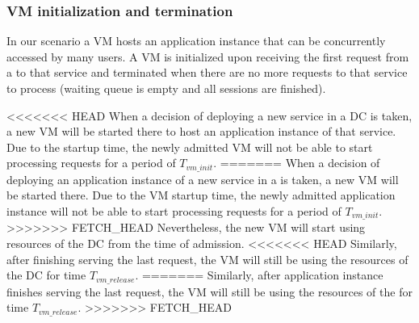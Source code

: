 \subsubsection{VM initialization and termination}
In our scenario a VM hosts an application instance that can be concurrently accessed by many users.
A VM is initialized upon receiving the first request from a \ue{} to that service and terminated when there are no more requests to that service to process (waiting queue is empty and all sessions are finished).

<<<<<<< HEAD
When a decision of deploying a new service in a \ac{DC} is taken, a new VM will be started there to host an application instance of that service.
Due to the startup time, the newly admitted VM will not be able to start processing requests for a period of $T_{vm\_init}$. 
=======
When a decision of deploying an application instance of a new service in a \dc{} is taken, a new VM will be started there.
Due to the VM startup time, the newly admitted application instance will not be able to start processing requests for a period of $T_{vm\_init}$. 
>>>>>>> FETCH_HEAD
Nevertheless, the new VM will start using resources of the \ac{DC} from the time of admission.
<<<<<<< HEAD
Similarly, after finishing serving the last request, the VM will still be using the resources of the \ac{DC} for time $T_{vm\_release}$.
=======
Similarly, after application instance finishes serving the last request, the VM will still be using the resources of the \dc{} for time $T_{vm\_release}$.
>>>>>>> FETCH_HEAD


